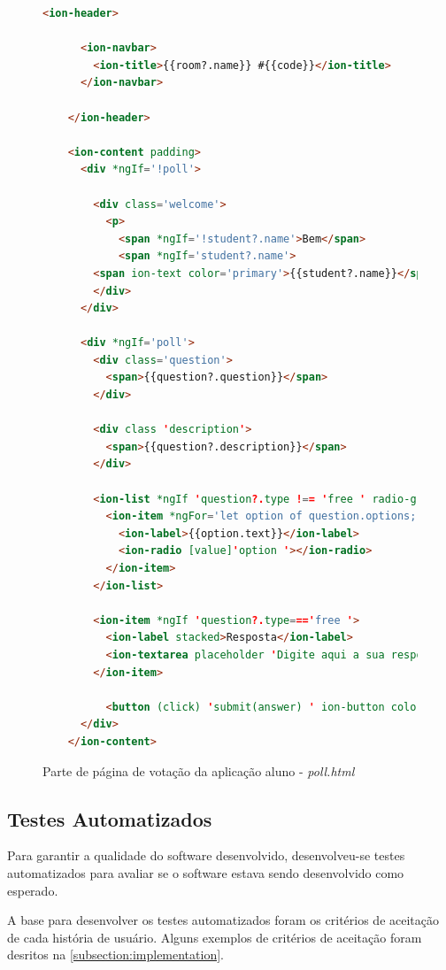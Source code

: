 \begin{figure}[!ht]
  \caption{Parte de página de votação da aplicação aluno - \textit{poll.html}}
  \label{fig:ionic_pollpage_html}
  \begin{lstlisting}[language=HTML]
    <ion-header>

      <ion-navbar>
        <ion-title>{{room?.name}} #{{code}}</ion-title>
      </ion-navbar>

    </ion-header>

    <ion-content padding>
      <div *ngIf='!poll'>

        <div class='welcome'>
          <p>
            <span *ngIf='!student?.name'>Bem</span>
            <span *ngIf='student?.name'>
        <span ion-text color='primary'>{{student?.name}}</span>, bem
        </div>
      </div>

      <div *ngIf='poll'>
        <div class='question'>
          <span>{{question?.question}}</span>
        </div>

        <div class 'description'>
          <span>{{question?.description}}</span>
        </div>

        <ion-list *ngIf 'question?.type !== 'free ' radio-group [(ngModel)]'answer '>
          <ion-item *ngFor='let option of question.options; let i=index '>
            <ion-label>{{option.text}}</ion-label>
            <ion-radio [value]'option '></ion-radio>
          </ion-item>
        </ion-list>

        <ion-item *ngIf 'question?.type==='free '>
          <ion-label stacked>Resposta</ion-label>
          <ion-textarea placeholder 'Digite aqui a sua resposta ' [(ngModel)] 'answer '></ion-textarea>
        </ion-item>

          <button (click) 'submit(answer) ' ion-button color 'primary ' full>ENVIAR</button>
      </div>
    </ion-content>
\end{lstlisting}
\doautor
\end{figure}

\subsection{Testes Automatizados}

Para garantir a qualidade do software desenvolvido, desenvolveu-se testes
automatizados para avaliar se o software estava sendo desenvolvido como esperado.

A base para desenvolver os testes automatizados foram os critérios de aceitação de cada história de usuário.
Alguns exemplos de critérios de aceitação foram desritos na \autoref{subsection:implementation}.

